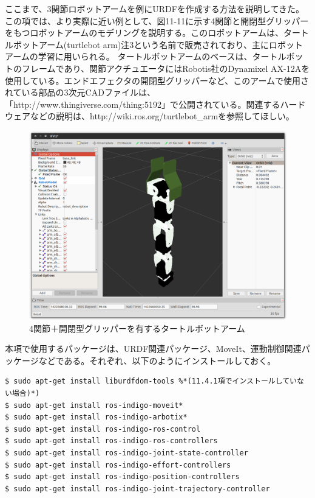 ここまで、3関節ロボットアームを例にURDFを作成する方法を説明してきた。この項では、より実際に近い例として、図11-11に示す4関節と開閉型グリッパーをもつロボットアームのモデリングを説明する。このロボットアームは、タートルボットアーム(turtlebot arm)注3という名前で販売されており、主にロボットアームの学習に用いられる。
タートルボットアームのベースは、タートルボットのフレームであり、関節アクチュエータにはRobotis社のDynamixel AX-12Aを使用している。エンドエフェクタの開閉型グリッパーなど、このアームで使用されている部品の3次元CADファイルは、「http://www.thingiverse.com/thing:5192」で公開されている。関連するハードウェアなどの説明は、http://wiki.ros.org/turtlebot\_armを参照してほしい。

\begin{figure}[ht]
  \centering
  \includegraphics[width=\columnwidth]{pictures/chapter11/pic_11_11.png}
  \caption{4関節＋開閉型グリッパーを有するタートルボットアーム}
\end{figure}

本項で使用するパッケージは、URDF関連パッケージ、MoveIt、運動制御関連パッケージなどである。それぞれ、以下のようにインストールしておく。

\begin{lstlisting}[language=ROS]
$ sudo apt-get install liburdfdom-tools %*(11.4.1項でインストールしていない場合)*)
$ sudo apt-get install ros-indigo-moveit*
$ sudo apt-get install ros-indigo-arbotix*
$ sudo apt-get install ros-indigo-ros-control
$ sudo apt-get install ros-indigo-ros-controllers
$ sudo apt-get install ros-indigo-joint-state-controller
$ sudo apt-get install ros-indigo-effort-controllers
$ sudo apt-get install ros-indigo-position-controllers
$ sudo apt-get install ros-indigo-joint-trajectory-controller
\end{lstlisting}

